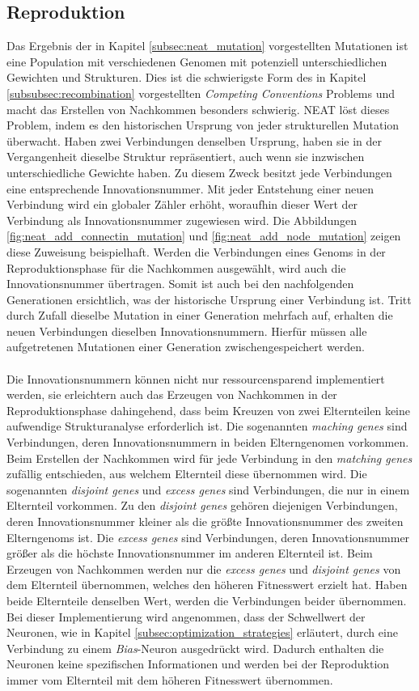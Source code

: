 \subsection{Reproduktion}
\label{subsec:neat_reproduction}
Das Ergebnis der in Kapitel \ref{subsec:neat_mutation} vorgestellten Mutationen ist eine Population mit verschiedenen Genomen mit potenziell unterschiedlichen Gewichten und Strukturen. Dies ist die schwierigste Form des in Kapitel \ref{subsubsec:recombination} vorgestellten \emph{Competing Conventions} Problems und macht das Erstellen von Nachkommen besonders schwierig. \ac{NEAT} löst dieses Problem, indem es den historischen Ursprung von jeder strukturellen Mutation überwacht. Haben zwei Verbindungen denselben Ursprung, haben sie in der Vergangenheit dieselbe Struktur repräsentiert, auch wenn sie inzwischen unterschiedliche Gewichte haben. Zu diesem Zweck besitzt jede Verbindungen eine entsprechende Innovationsnummer. Mit jeder Entstehung einer neuen Verbindung wird ein globaler Zähler erhöht, woraufhin dieser Wert der Verbindung als Innovationsnummer zugewiesen wird. Die Abbildungen \ref{fig:neat_add_connectin_mutation} und \ref{fig:neat_add_node_mutation} zeigen diese Zuweisung beispielhaft. Werden die Verbindungen eines Genoms in der Reproduktionsphase für die Nachkommen ausgewählt, wird auch die Innovationsnummer übertragen. Somit ist auch bei den nachfolgenden Generationen ersichtlich, was der historische Ursprung einer Verbindung ist. Tritt durch Zufall dieselbe Mutation in einer Generation mehrfach auf, erhalten die neuen Verbindungen dieselben Innovationsnummern. Hierfür müssen alle aufgetretenen Mutationen einer Generation zwischengespeichert werden. 
\\\\
Die Innovationsnummern können nicht nur ressourcensparend implementiert werden, sie erleichtern auch das Erzeugen von Nachkommen in der Reproduktionsphase dahingehend, dass beim Kreuzen von zwei Elternteilen keine aufwendige Strukturanalyse erforderlich ist. Die sogenannten \emph{maching genes} sind Verbindungen, deren Innovationsnummern in beiden Elterngenomen vorkommen. Beim Erstellen der Nachkommen wird für jede Verbindung in den \emph{matching genes} zufällig entschieden, aus welchem Elternteil diese übernommen wird. Die sogenannten \emph{disjoint genes} und \emph{excess genes} sind Verbindungen, die nur in einem Elternteil vorkommen. Zu den \emph{disjoint genes} gehören diejenigen Verbindungen, deren Innovationsnummer kleiner als die größte Innovationsnummer des zweiten Elterngenoms ist. Die \emph{excess genes} sind Verbindungen, deren Innovationsnummer größer als die höchste Innovationsnummer im anderen Elternteil ist. Beim Erzeugen von Nachkommen werden nur die \emph{excess genes} und \emph{disjoint genes} von dem Elternteil übernommen, welches den höheren Fitnesswert erzielt hat. Haben beide Elternteile denselben Wert, werden die Verbindungen beider übernommen. 
Bei dieser Implementierung wird angenommen, dass der Schwellwert der Neuronen, wie in Kapitel \ref{subsec:optimization_strategies} erläutert, durch eine Verbindung zu einem \emph{Bias}-Neuron ausgedrückt wird. Dadurch enthalten die Neuronen keine spezifischen Informationen und werden bei der Reproduktion immer vom Elternteil mit dem höheren Fitnesswert übernommen.
